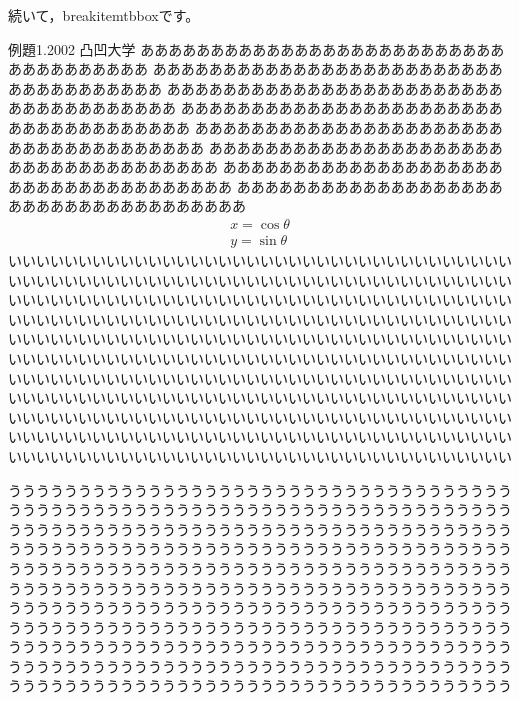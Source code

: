 \documentclass{jarticle}
\begin{document}
続いて，\textsf{breakitemtbbox}です。

\begin{breakitemtbbox}{例題1.}{2002 凸凹大学}
ああああああああああああああああああああああああああああああああああああ
ああああああああああああああああああああああああああああああああああああ
ああああああああああああああああああああああああああああああああああああ
ああああああああああああああああああああああああああああああああああああ
ああああああああああああああああああああああああああああああああああああ
ああああああああああああああああああああああああああああああああああああ
ああああああああああああああああああああああああああああああああああああ
ああああああああああああああああああああああああああああああああああああ
\begin{align}
  x=\cos\theta\\
  y=\sin\theta
\end{align}
いいいいいいいいいいいいいいいいいいいいいいいいいいいいいいいいいいいい
いいいいいいいいいいいいいいいいいいいいいいいいいいいいいいいいいいいい
いいいいいいいいいいいいいいいいいいいいいいいいいいいいいいいいいいいい
いいいいいいいいいいいいいいいいいいいいいいいいいいいいいいいいいいいい
いいいいいいいいいいいいいいいいいいいいいいいいいいいいいいいいいいいい
いいいいいいいいいいいいいいいいいいいいいいいいいいいいいいいいいいいい
いいいいいいいいいいいいいいいいいいいいいいいいいいいいいいいいいいいい
いいいいいいいいいいいいいいいいいいいいいいいいいいいいいいいいいいいい
いいいいいいいいいいいいいいいいいいいいいいいいいいいいいいいいいいいい
いいいいいいいいいいいいいいいいいいいいいいいいいいいいいいいいいいいい
いいいいいいいいいいいいいいいいいいいいいいいいいいいいいいいいいいいい

うううううううううううううううううううううううううううううううううううう
うううううううううううううううううううううううううううううううううううう
うううううううううううううううううううううううううううううううううううう
うううううううううううううううううううううううううううううううううううう
うううううううううううううううううううううううううううううううううううう
うううううううううううううううううううううううううううううううううううう
うううううううううううううううううううううううううううううううううううう
うううううううううううううううううううううううううううううううううううう
うううううううううううううううううううううううううううううううううううう
うううううううううううううううううううううううううううううううううううう
うううううううううううううううううううううううううううううううううううう
\end{breakitemtbbox}
\clearpage
\end{document}
